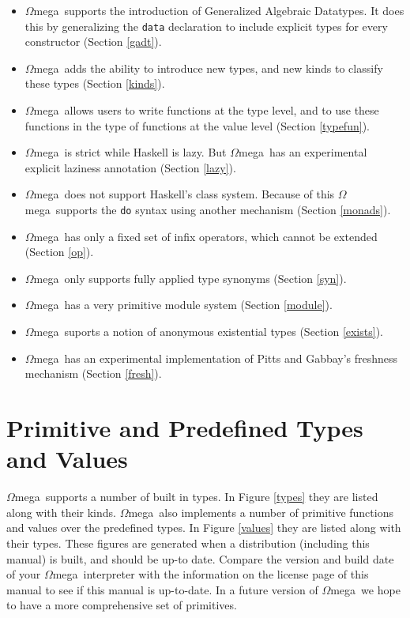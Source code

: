 \documentclass[11pt,twoside]{article}
\newcommand{\om}{$\Omega$mega}
\begin{document}
\begin{itemize}

\item \om\ supports the introduction of Generalized Algebraic Datatypes.
It does this by generalizing the {\tt data} declaration to
include explicit types for every constructor (Section \ref{gadt}).

\item \om\ adds the ability to introduce new types, and new kinds to
classify these types (Section \ref{kinds}).

\item \om\ allows users to write functions at the type level, and to use these
functions in the type of functions at the value level (Section \ref{typefun}).

\item \om\ is strict while Haskell is lazy. But \om\ has an experimental
explicit laziness annotation (Section \ref{lazy}).

\item \om\ does not support Haskell's class system. Because of this
\om\ supports the {\tt do} syntax using another mechanism (Section \ref{monads}).

\item \om\ has only a fixed set of infix operators, which cannot be extended (Section \ref{op}).

\item \om\ only supports fully applied type synonyms (Section \ref{syn}).

\item \om\ has a very primitive module system (Section \ref{module}).

\item \om\ suports a notion of anonymous existential types (Section \ref{exists}).

\item \om\ has an experimental implementation of Pitts and Gabbay's freshness
mechanism (Section \ref{fresh}).

\end{itemize}



%

\section{Primitive and Predefined Types and Values} \label{predefined}

\om\ supports a number of built in types. In Figure \ref{types} they are listed
along with their kinds. \om\ also implements a number of primitive
functions and values over the predefined types. In Figure \ref{values} they are
listed along with their types. These figures are generated when a
distribution (including this manual) is built, and should be up-to date. Compare
the version and build date of your \om\ interpreter with the information on the
license page of this manual to see if this manual is up-to-date. In a future
version of \om\ we hope to have a more comprehensive set of primitives.
\end{document}
